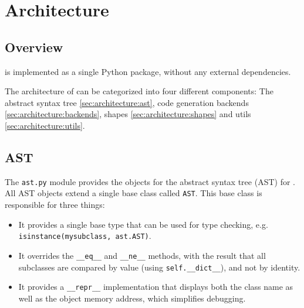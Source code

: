 
\chapter{Architecture}

\label{ch:architecture}


\section{Overview}\label{sec:architecture:overview}

\tangible{} is implemented as a single Python package, without any external
dependencies.

The architecture of \tangible{} can be categorized into four different
components: The abstract syntax tree \eqref{sec:architecture:ast}, code
generation backends \eqref{sec:architecture:backends}, shapes
\eqref{sec:architecture:shapes} and utils \eqref{sec:architecture:utils}.

\vspace{7mm}


\section{AST}\label{sec:architecture:ast}

The \texttt{ast.py} module provides the objects for the abstract syntax tree
(AST) for \tangible{}. All AST objects extend a single base class called
\texttt{AST}. This base class is responsible for three things:

\begin{itemize}
	\item It provides a single base type that can be used for type checking, e.g.
		\texttt{isinstance(mysubclass, ast.AST)}.
	\item It overrides the \texttt{\_\_eq\_\_} and \texttt{\_\_ne\_\_} methods,
		with the result that all subclasses are compared by value (using
		\texttt{self.\_\_dict\_\_}), and not by identity.
	\item It provides a \texttt{\_\_repr\_\_} implementation that displays both
		the class name as well as the object memory address, which simplifies
		debugging.
\end{itemize}

